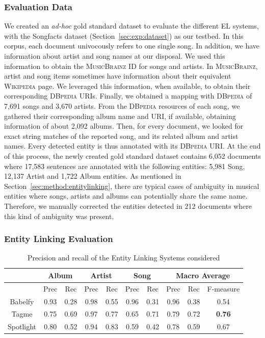 \subsubsection{Evaluation Data}

We created an \textit{ad-hoc} gold standard dataset to evaluate the different EL systems, with the Songfacts dataset (Section~\ref{sec:exp:dataset}) as our testbed. In this corpus, each document univocously refers to one single song. In addition, we have information about artist and song names at our disposal. We used this information to obtain the \textsc{MusicBrainz} ID for songs and artists. In \textsc{MusicBrainz}, artist and song items sometimes have information about their equivalent \textsc{Wikipedia} page. We leveraged this information, when available, to obtain their corresponding \textsc{DBpedia} URIs. Finally, we obtained a mapping with \textsc{DBpedia} of 7,691 songs and 3,670 artists. From the \textsc{DBpedia} resources of each song, we gathered their corresponding album name and URI, if available, obtaining information of about 2,092 albums. Then, for every document, we looked for exact string matches of the reported song, and its related album and artist names. Every detected entity is thus annotated with its \textsc{DBpedia} URI. At the end of this process, the newly created gold standard dataset contains 6,052 documents where 17,583 sentences are annotated with the following entities: 5,981 Song, 12,137 Artist and 1,722 Album entities. As mentioned in Section~\ref{sec:method:entitylinking}, there are typical cases of ambiguity in musical entities where songs, artists and albums can potentially share the same name. Therefore, we manually corrected the entities detected in 212 documents where this kind of ambiguity was present.


\subsubsection{Entity Linking Evaluation}

\begin{table}[ht!]
\scriptsize
\centering
	\begin{tabular}{ | c | c | c | c | c | c | c | c | c | c | }
	\hline
& \multicolumn{2}{|c|}{Album} & \multicolumn{2}{|c|}{Artist} & \multicolumn{2}{|c|}{Song} & \multicolumn{3}{|c|}{Macro Average}  \\
\hline
	& Prec & Rec & Prec & Rec & Prec & Rec & Prec & Rec & F-measure \\
	\hline
Babelfy & 0.93 & 0.28 & 0.98 & 0.55 & 0.96 & 0.31 & 0.96 & 0.38 & 0.54 \\
Tagme & 0.75 & 0.69 & 0.97 & 0.77 & 0.65 & 0.71 & 0.79 & 0.72 & \textbf{0.76} \\
Spotlight & 0.80 & 0.52 & 0.94 & 0.83 & 0.59 & 0.42 & 0.78 & 0.59 & 0.67 \\
\hline
	\end{tabular}
	\caption{Precision and recall of the Entity Linking Systems considered}
	\label{tbl:res_categories}
\end{table}


